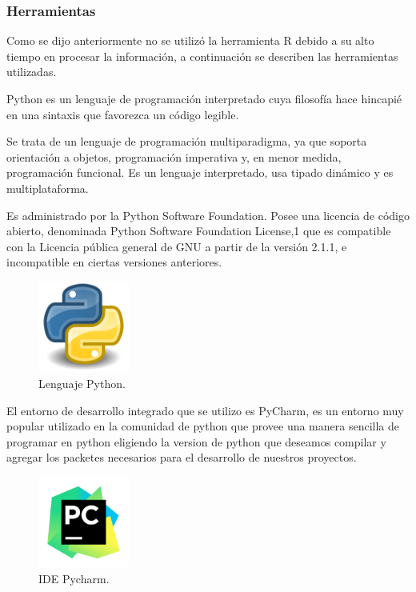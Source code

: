 \documentclass[12pt]{article}
\newcounter{subsubsubsection}[subsubsection]
\begin{document}
\subsubsection{Herramientas}
Como se dijo anteriormente no se utilizó la herramienta R debido a su alto tiempo en procesar la información, a continuación se describen las herramientas utilizadas.

Python es un lenguaje de programación interpretado cuya filosofía hace hincapié en una sintaxis que favorezca un código legible.

Se trata de un lenguaje de programación multiparadigma, ya que soporta orientación a objetos, programación imperativa y, en menor medida, programación funcional. Es un lenguaje interpretado, usa tipado dinámico y es multiplataforma.

Es administrado por la Python Software Foundation. Posee una licencia de código abierto, denominada Python Software Foundation License,1 que es compatible con la Licencia pública general de GNU a partir de la versión 2.1.1, e incompatible en ciertas versiones anteriores.\cite{python}

\begin{figure}[h]
\includegraphics[width=3cm, height=3cm]{python}
\centering
\caption{Lenguaje Python.}
\label{fig:FUNCACT}
\end{figure}

El entorno de desarrollo integrado que se utilizo es PyCharm, es un entorno muy popular utilizado en la comunidad de python que provee una manera sencilla de programar en python eligiendo la version de python que deseamos compilar y agregar los packetes necesarios para el desarrollo de nuestros proyectos.

\begin{figure}[h]
\includegraphics[width=3cm, height=3cm]{pycharm}
\centering
\caption{IDE Pycharm.}
\label{fig:FUNCACT}
\end{figure}
\end{document}
